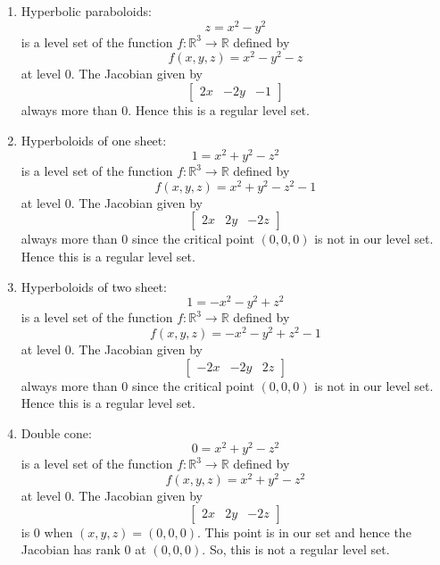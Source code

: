 \documentclass[12pt]{article}
\newcommand{\rl}{\mathbb{R}}
\begin{document}
\begin{enumerate}
\begin{mybox}
\begin{enumerate}
        \vspace*{3mm}
        \item Hyperbolic paraboloids:
        $$z=x^2-y^2$$ is a level set of the function
        $f:\rl^3\to\rl$ defined by
        $$f(x,y,z)=
        x^2-y^2-z$$
        at level 0. The Jacobian given by
        $$\left[\begin{array}{ccc}
            2x &-2y &-1
        \end{array}\right]$$
        always more than 0. Hence this is a regular level
        set.

        \vspace*{3mm}
        \item Hyperboloids of one sheet:
        $$1=x^2+y^2-z^2$$ is a level set of the function
        $f:\rl^3\to\rl$ defined by
        $$f(x,y,z)=
        x^2+y^2-z^2-1$$
        at level 0. The Jacobian given by
        $$\left[\begin{array}{ccc}
            2x &2y &-2z
        \end{array}\right]$$
        always more than 0 since the critical point
        $(0,0,0)$ is not in our level set.
        Hence this is a regular level
        set.

        \vspace*{3mm}
        \item Hyperboloids of two sheet:
        $$1=-x^2-y^2+z^2$$ is a level set of the function
        $f:\rl^3\to\rl$ defined by
        $$f(x,y,z)=
        -x^2-y^2+z^2-1$$
        at level 0. The Jacobian given by
        $$\left[\begin{array}{ccc}
            -2x &-2y &2z
        \end{array}\right]$$
        always more than 0 since the critical point
        $(0,0,0)$ is not in our level set.
        Hence this is a regular level
        set.

        \vspace*{3mm}
        \item Double cone:
        $$0=x^2+y^2-z^2$$ is a level set of the function
        $f:\rl^3\to\rl$ defined by
        $$f(x,y,z)=
        x^2+y^2-z^2$$
        at level 0. The Jacobian given by
        $$\left[\begin{array}{ccc}
            2x &2y &-2z
        \end{array}\right]$$
        is 0 when $(x,y,z)=(0,0,0)$. This point is in our
        set and hence the Jacobian has rank 0 at $(0,0,0)$.
        So, this is not a regular level set.
    \end{enumerate}
\end{mybox}



\end{enumerate}
\end{document}
